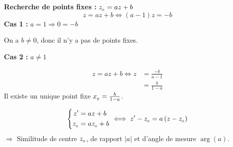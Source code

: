 \documentclass[12pt,twoside,a4paper]{article}
\begin{document}
\begin{liste}
				\textbf{Recherche de points fixes :} $z_{_{0}}=az+b$
				$$
					z=az+b\iff\left(a-1\right)z=-b
				$$
				\textbf{Cas 1 :} $a=1\Rightarrow0=-b$
				\begin{tab}
					On a $b\neq0$, donc il n'y a pas de points fixes.
				\end{tab}
				\textbf{Cas 2 :} $a\neq1$
				\begin{tab}
					$$\begin{aligned}
						z=az+b\iff z&=\frac{-b}{a-1} \\
								   &=\frac{b}{1-a}
					\end{aligned}$$
					Il existe un unique point fixe $x_{_{0}}=\frac{b}{1-a}$.
				\end{tab}
				$$
					\left\{\begin{aligned}z'&=az+b \\
										z_{_{0}}&=az_{_{0}}+b\end{aligned}\right.\iff z'-z_{_{0}}=a\left(z-z_{_{0}}\right)
				$$
				$\Rightarrow$ Similitude de centre $z_{_{0}}$, de rapport $\left|a\right|$ et d'angle de mesure $\arg\left(a\right)$.
		\end{liste}
\end{document}
